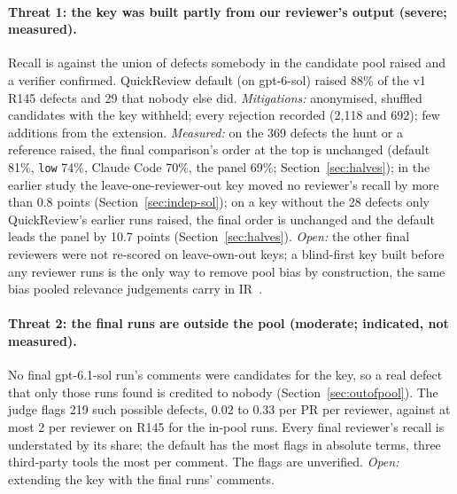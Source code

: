\documentclass[11pt,a4paper]{article}
\newcommand{\qcr}{QuickReview}
\newcommand{\code}[1]{\texttt{#1}}
\begin{document}
\paragraph{Threat 1: the key was built partly from our reviewer's output (severe; measured).}
Recall is against the union of defects somebody in the candidate pool raised
and a verifier confirmed. \qcr{} default (on gpt-6-sol) raised 88\% of the v1
R145 defects and 29 that nobody else did. \emph{Mitigations:} anonymised,
shuffled candidates with the key withheld; every rejection recorded (2{,}118
and 692); few additions from the extension. \emph{Measured:} on the 369
defects the hunt or a reference raised, the final comparison's order at the
top is unchanged (default 81\%, \code{low} 74\%, Claude Code 70\%, the panel
69\%; Section~\ref{sec:halves}); in the earlier study the
leave-one-reviewer-out key moved no reviewer's recall by more than 0.8 points
(Section~\ref{sec:indep-sol}); on a key without the 28 defects only
\qcr{}'s earlier runs raised, the final order is unchanged and the default
leads the panel by 10.7 points (Section~\ref{sec:halves}). \emph{Open:}
the other final reviewers were not re-scored on leave-own-out keys; a
blind-first key built before any
reviewer runs is the only way to remove pool bias by construction, the same
bias pooled relevance judgements carry in IR~\cite{zobel1998,buckley2007}.

\paragraph{Threat 2: the final runs are outside the pool (moderate; indicated, not measured).}
No final gpt-6.1-sol run's comments were candidates for the key, so a real
defect that only those runs found is credited to nobody
(Section~\ref{sec:outofpool}). The judge flags 219 such possible defects,
0.02 to 0.33 per PR per reviewer, against at most 2 per reviewer on R145 for
the in-pool runs. Every final reviewer's recall is understated by its share;
the default has the most flags in absolute terms, three third-party tools
the most per comment. The flags are unverified. \emph{Open:} extending the
key with the final runs' comments.
\end{document}
